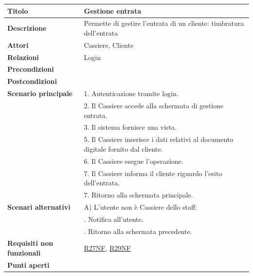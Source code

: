 \documentclass[a4paper]{article}
\begin{document}


  \begin{center}
    \begin{tabularx}{1\textwidth}{l|X}
        \textbf{Titolo} & Gestione entrata \\
        \hline
        \textbf{Descrizione} & Permette di gestire l'entrata di un cliente: timbratura dell'entrata \\
        \hline
        \textbf{Attori} & Cassiere, Cliente \\
        \hline
        \textbf{Relazioni} & Login \\
        \hline
        \textbf{Precondizioni} &  \\
        \hline
        \textbf{Postcondizioni} &  \\
        \hline
        \textbf{Scenario principale} & 1. Autenticazione tramite login. \\
                                     & 2. Il Cassiere accede alla schermata di gestione entrata. \\
                                     & 3. Il sistema fornisce una vista.\\
                                     & 5. Il Cassiere inserisce i dati relativi al documento digitale fornito dal cliente.\\
                                     & 6. Il Cassiere esegue l'operazione.\\
                                     & 7. Il Cassiere informa il cliente riguardo l'esito dell'entrata.\\
                                     & 7. Ritorno alla schermata principale.\\
        \hline
        \textbf{Scenari alternativi} & A) L'utente non è Cassiere dello staff: \\
                                     & \quad 1. Notifica all'utente. \\
                                     & \quad 2. Ritorno alla schermata precedente. \\
        \hline
        \textbf{Requisiti non funzionali} & \hyperlink{R27NF}{R27NF}, \hyperlink{R29NF}{R29NF} \\
        \hline
        \textbf{Punti aperti} & \\
        \hline
    \end{tabularx}
  \end{center}
\end{document}
